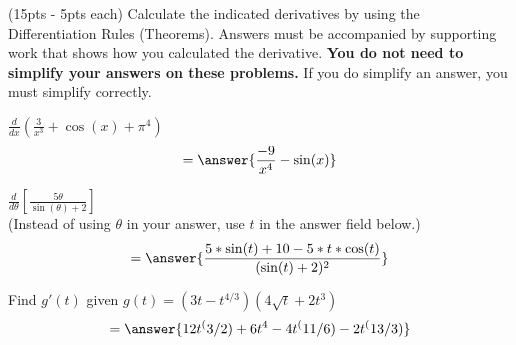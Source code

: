 \documentclass[handout]{ximera}
\begin{document}
\medskip
(15pts - 5pts each) Calculate the indicated derivatives by using the Differentiation Rules (Theorems). Answers must be accompanied by supporting work that shows how you calculated the derivative. \textbf{You do not need to simplify your answers on these problems.} If you do simplify an answer, you must simplify correctly. 

\begin{problem}
$\displaystyle \frac{d}{dx}\left(\frac{3}{x^3}+\cos(x)+\pi^4\right)$
\[
= \answer{\dfrac{-9}{x^4} - \sin(x)}
\]

\end{problem}

\begin{problem}
$\displaystyle \frac{d}{d\theta}\left[\frac{5\theta}{\sin(\theta)+2}\right]$ \\
(Instead of using $\theta$ in your answer, use $t$ in the answer field below.)\\
\[
= \answer{\dfrac{5*\sin(t) + 10 - 5*t*\cos(t)}{(\sin(t) + 2)^2}}
\]
\end{problem}


\begin{problem}
Find $g'(t)$ given $\displaystyle g(t)=(3t-t^{4/3})(4\sqrt{t}+2t^3)$
\[
= \answer{12t^(3/2) + 6t^4 - 4t^(11/6) - 2t^(13/3)}
\]
\end{problem}
\end{document}

